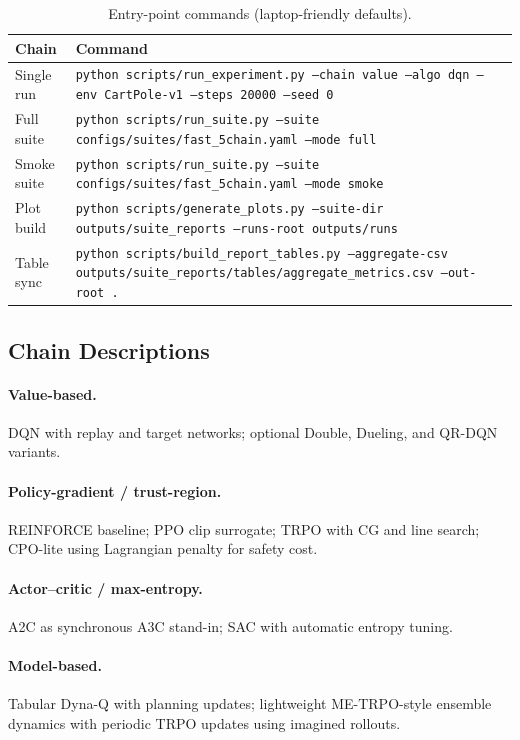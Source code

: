 \documentclass[12pt]{article}
\newcommand{\code}[1]{\texttt{#1}}
\begin{document}
\begin{table}[h]
    \centering
    \caption{Entry-point commands (laptop-friendly defaults).}\label{tab:commands}
    \begin{tabular}{ll}
        \toprule
        Chain & Command \\
        \midrule
        Single run & \code{python scripts/run\_experiment.py --chain value --algo dqn --env CartPole-v1 --steps 20000 --seed 0} \\
        Full suite & \code{python scripts/run\_suite.py --suite configs/suites/fast\_5chain.yaml --mode full} \\
        Smoke suite & \code{python scripts/run\_suite.py --suite configs/suites/fast\_5chain.yaml --mode smoke} \\
        Plot build & \code{python scripts/generate\_plots.py --suite-dir outputs/suite\_reports --runs-root outputs/runs} \\
        Table sync & \code{python scripts/build\_report\_tables.py --aggregate-csv outputs/suite\_reports/tables/aggregate\_metrics.csv --out-root .} \\
        \bottomrule
    \end{tabular}
\end{table}

\subsection{Chain Descriptions}
\paragraph{Value-based.} DQN with replay and target networks; optional Double, Dueling, and QR-DQN variants.
\paragraph{Policy-gradient / trust-region.} REINFORCE baseline; PPO clip surrogate; TRPO with CG and line search; CPO-lite using Lagrangian penalty for safety cost.
\paragraph{Actor--critic / max-entropy.} A2C as synchronous A3C stand-in; SAC with automatic entropy tuning.
\paragraph{Model-based.} Tabular Dyna-Q with planning updates; lightweight ME-TRPO-style ensemble dynamics with periodic TRPO updates using imagined rollouts.
\end{document}
